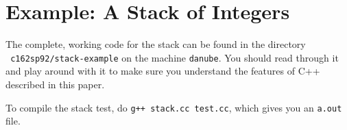 \section{Example: A Stack of Integers}

The complete, working code for the stack can be found in the directory
{\tt ~c162sp92/stack-example} on the machine {\tt danube}.  You should
read through it and play around with it to make sure you understand
the features of C++ described in this paper.

To compile the stack test, do {\tt g++ stack.cc test.cc}, which gives
you an {\tt a.out} file.


